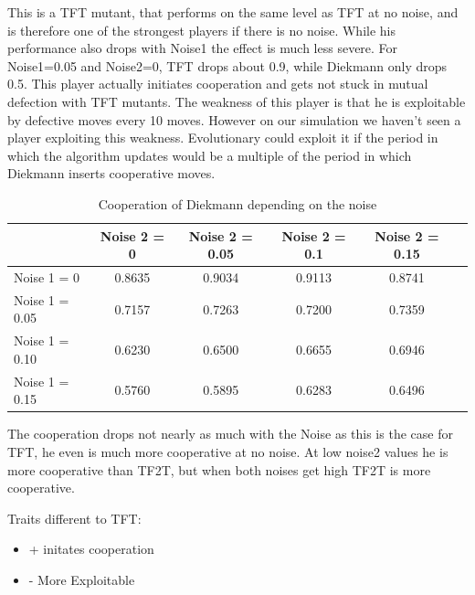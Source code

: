 This is a TFT mutant, that performs on the same level as TFT at no noise, and is therefore one of the strongest players if there is no noise. While his performance also drops with Noise1 the effect is much less severe. For Noise1=0.05 and Noise2=0, TFT drops about 0.9, while Diekmann only drops 0.5. This player actually initiates cooperation and gets not stuck in mutual defection with TFT mutants. The weakness of this player is that he is exploitable by defective moves every 10 moves. However on our simulation we haven't seen a player exploiting this weakness. Evolutionary could exploit it if the period in which the algorithm updates would be a multiple of the period in which Diekmann inserts cooperative moves.

\begin{table}[h]
 \begin{center}
\caption{Cooperation of Diekmann depending on the noise} \vspace{3mm}
\begin{tabular}{|l|c|c|c|c|c|}
\hline
   	& Noise 2 = 0 & Noise 2 = 0.05& Noise 2 = 0.1& Noise 2 = 0.15 \\
  \hline
  Noise 1 = 0 	&               0.8635 &   0.9034   & 0.9113 &  0.8741 \\
 \hline
  Noise 1 = 0.05	 &            0.7157 &   0.7263  &  0.7200  &  0.7359 \\
 \hline
  Noise 1 = 0.10 	&           0.6230  &  0.6500  &  0.6655 &   0.6946 \\
 \hline
  Noise 1 = 0.15 	&   0.5760 &   0.5895  &  0.6283 &   0.6496 \\
 \hline
\end{tabular}
 \end{center}
\end{table}

The cooperation drops not nearly as much with the Noise as this is the case for TFT, he even is much more cooperative at no noise. At low noise2 values he is more cooperative than TF2T, but when both noises get high TF2T is more cooperative.

Traits different to TFT:

\renewcommand{\labelitemi}{}
\begin{itemize}
	\item + initates cooperation
	\item - More Exploitable
\end{itemize}
\renewcommand{\labelitemi}{$\bullet$}
 

